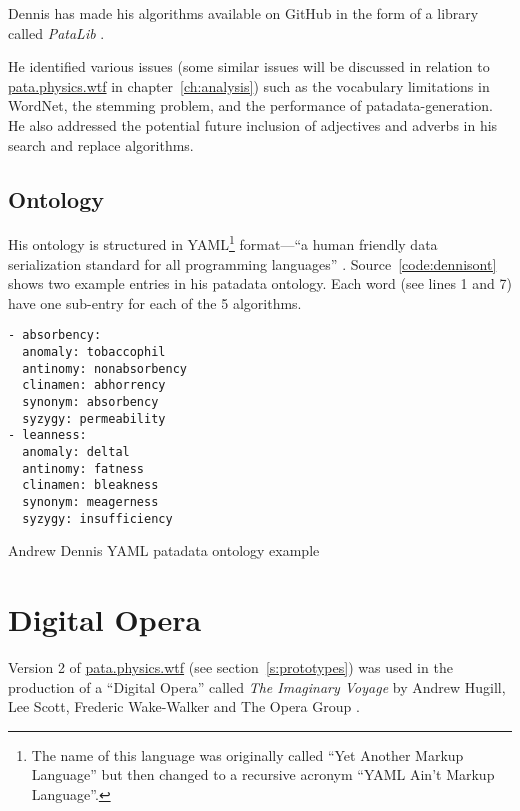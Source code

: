 Dennis has made his algorithms available on GitHub in the form of a library called \textit{PataLib} \autocite{Dennis2016a}.

He identified various issues (some similar issues will be discussed in relation to \url{pata.physics.wtf} in chapter~\ref{ch:analysis}) such as the vocabulary limitations in WordNet, the stemming problem, and the performance of patadata-generation. He also addressed the potential future inclusion of adjectives and adverbs in his search and replace algorithms.


\subsection{Ontology}

His ontology is structured in \ac{YAML}\footnote{The name of this language was originally called ``Yet Another Markup Language'' but then changed to a recursive acronym ``YAML Ain't Markup Language''.} format---``a human friendly data serialization standard for all programming languages'' \autocite{Evans2016}. Source~\ref{code:dennisont} shows two example entries in his patadata ontology. Each word (see lines 1 and 7) have one sub-entry for each of the 5 algorithms.

\begin{listing}[!htbp] %
  \begin{verbatim}
- absorbency:
  anomaly: tobaccophil
  antinomy: nonabsorbency
  clinamen: abhorrency
  synonym: absorbency
  syzygy: permeability
- leanness:
  anomaly: deltal
  antinomy: fatness
  clinamen: bleakness
  synonym: meagerness
  syzygy: insufficiency
  \end{verbatim}
\caption[Dennis patadata ontology]{Andrew Dennis \ac{YAML} patadata ontology example}
\label{code:dennisont}
\end{listing}


\section{Digital Opera}
\label{s:opera}

Version 2 of \url{pata.physics.wtf} (see section~\ref{s:prototypes}) was used in the production of a ``Digital Opera'' called \textit{The Imaginary Voyage} \autocite{Hugill2014,Hugill2013a} by Andrew Hugill, Lee Scott, Frederic Wake-Walker and The Opera Group \autocite{Mahogany2016}.

